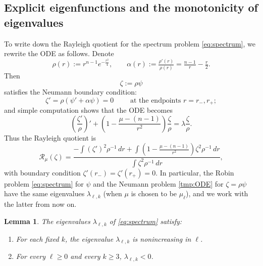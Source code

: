 \documentclass[11pt]{article}
\numberwithin{equation}{section}
\newtheorem{lemma}[theorem]{Lemma}
\theoremstyle{definition}
\begin{document}
\subsection{Explicit eigenfunctions and the monotonicity of eigenvalues}\label{ssec:modes}

To write down the Rayleigh quotient for the spectrum problem \eqref{eq:spectrum}, we rewrite the ODE as follows. Denote
\[ \rho(r) := r^{n-1} e^{-\frac{r^2}{4}}, \qquad \alpha(r) := \tfrac{\rho'(r)}{\rho(r)} = \tfrac{n-1}{r} - \tfrac{r}{2}.  \]
Then
\begin{equation}\label{eq:p-transform}
    \zeta:=\rho\psi
\end{equation}
satisfies the Neumann boundary condition:
\begin{equation}\label{tmp:BC}
	\zeta' = \rho (\psi'+ \alpha \psi) = 0 \qquad \text{ at the endpoints } r=r_-, r_+;
\end{equation}
and simple computation shows that the ODE becomes
\begin{equation}\label{tmp:ODE}
	\left( \frac{\zeta'}{\rho} \right)' + \left(1-\frac{\mu-(n-1)}{r^2} \right) \frac{\zeta}{\rho} = \lambda \frac{\zeta}{\rho}.\tag{$N_s$}
\end{equation}
Thus the Rayleigh quotient is
\begin{equation}\label{eq:rayleigh-p}
    \mathcal{R}_{\mu}(\zeta)= \dfrac{-\int (\zeta')^2 \rho^{-1} \, dr + \int\left(1-\frac{\mu-(n-1)}{r^2} \right) \zeta^2 \rho^{-1} \, dr}{\int \zeta^2 \rho^{-1} \, dr},
\end{equation}
with boundary condition $\zeta'(r_-) = \zeta'(r_+)=0$. In particular, the Robin problem \eqref{eq:spectrum} for $\psi$ and the Neumann problem \eqref{tmp:ODE} for $\zeta=\rho\psi$ have the same eigenvalues $\lambda_{\ell,k}$ (when $\mu$ is chosen to be $\mu_\ell$), and we work with the latter from now on.


\begin{lemma}\label{lem:mode-structure}
The eigenvalues $\lambda_{\ell,k}$ of \eqref{eq:spectrum} satisfy:
\begin{enumerate}[label=\textup{(\roman*)}]
\item For each fixed $k$, the eigenvalue $\lambda_{\ell,k}$ is nonincreasing in $\ell$.
\item For every $\ell\geq0$ and every $k\geq3$, $\lambda_{\ell,k}<0$.
\end{enumerate}
\end{lemma}
\end{document}
